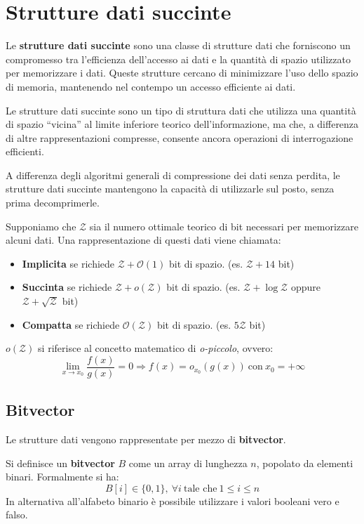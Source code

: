 \chapter{Strutture dati succinte}
Le \textbf{strutture dati succinte} sono una classe di strutture dati che forniscono
un compromesso tra l'efficienza dell'accesso ai dati e la quantità di spazio
utilizzato per memorizzare i dati. Queste strutture cercano di minimizzare l'uso
dello spazio di memoria, mantenendo nel contempo un accesso efficiente ai dati.

Le strutture dati succinte sono un tipo di struttura dati che utilizza una quantità
di spazio “vicina” al limite inferiore teorico dell'informazione, ma che, a differenza
di altre rappresentazioni compresse, consente ancora operazioni di interrogazione efficienti.

A differenza degli algoritmi generali di compressione dei dati senza perdita, le
strutture dati succinte mantengono la capacità di utilizzarle sul posto, senza
prima decomprimerle.

Supponiamo che $\mathcal{Z}$ sia il numero ottimale teorico di bit necessari per
memorizzare alcuni dati. Una rappresentazione di questi dati viene chiamata:
\begin{itemize}
    \item \textbf{Implicita} se richiede $\mathcal{Z} + \mathcal{O}(1)$ bit di
          spazio. (es. $\mathcal{Z} + 14$ bit)
    \item \textbf{Succinta} se richiede $\mathcal{Z} + o(\mathcal{Z})$ bit di spazio.
          (es. $\mathcal{Z} + \log \mathcal{Z}$ oppure $\mathcal{Z} + \sqrt{\mathcal{Z}}$ bit)
    \item \textbf{Compatta} se richiede $\mathcal{O}(\mathcal{Z})$ bit di spazio.
          (es. $5\mathcal{Z}$ bit)
\end{itemize}
\begin{nota}
    $o(\mathcal{Z})$ si riferisce al concetto matematico di \textit{o-piccolo},
    ovvero:
    \begin{equation}
        \lim_{x \to x_0} \frac{f(x)}{g(x)} = 0 \Rightarrow f(x) = o_{x_0} (g(x)) \ \text{con} \ x_0 = + \infty
    \end{equation}
\end{nota}
\section{Bitvector}
Le strutture dati vengono rappresentate per mezzo di \textbf{bitvector}.
\begin{definizione}
    Si definisce un \textbf{bitvector} $B$ come un array di lunghezza $n$, popolato
    da elementi binari. Formalmente si ha:
    \begin{equation}
        B[i] \in \{0, 1\}, \ \forall i \ \text{tale che} \ 1 \leq i \leq n
    \end{equation}
    In alternativa all'alfabeto binario è possibile utilizzare i valori booleani
    vero e falso.
\end{definizione}

